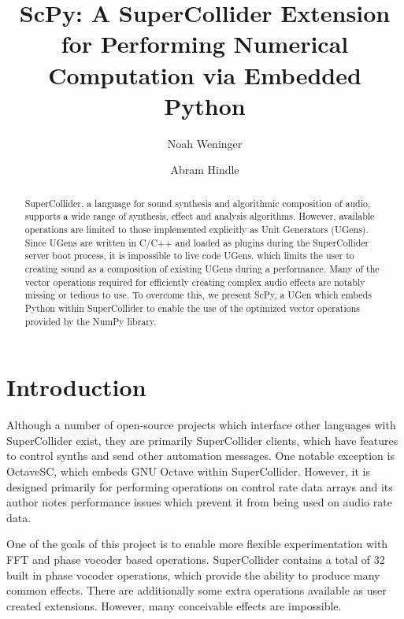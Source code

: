 \documentclass{article}
\begin{document}
\title{ScPy: A SuperCollider Extension for Performing Numerical Computation via Embedded Python}

\author{Noah Weninger \and Abram Hindle}

\maketitle

\begin{abstract}

    SuperCollider, a language for sound synthesis and algorithmic composition of audio, supports a
    wide range of synthesis, effect and analysis algorithms. However, available operations are
    limited to those implemented explicitly as Unit Generators (UGens). Since UGens are written in
    C/C++ and loaded as plugins during the SuperCollider server boot process, it is impossible to
    live code UGens, which limits the user to creating sound as a composition of existing UGens
    during a performance.  Many of the vector operations required for efficiently creating complex
    audio effects are notably missing or tedious to use. To overcome this, we present ScPy, a UGen
    which embeds Python within SuperCollider to enable the use of the optimized vector operations
    provided by the NumPy library.

\end{abstract}

\section{Introduction}

Although a number of open-source projects which interface other languages with SuperCollider exist,
they are primarily SuperCollider clients, which have features to control synths and send other
automation messages. One notable exception is OctaveSC, which embeds GNU Octave within
SuperCollider. However, it is designed primarily for performing operations on control rate data
arrays and its author notes performance issues which prevent it from being used on audio rate data.

One of the goals of this project is to enable more flexible experimentation with FFT and phase
vocoder based operations. SuperCollider contains a total of 32 built in phase vocoder operations,
which provide the ability to produce many common effects. There are additionally some extra
operations available as user created extensions. However, many conceivable effects are impossible.
\end{document}
